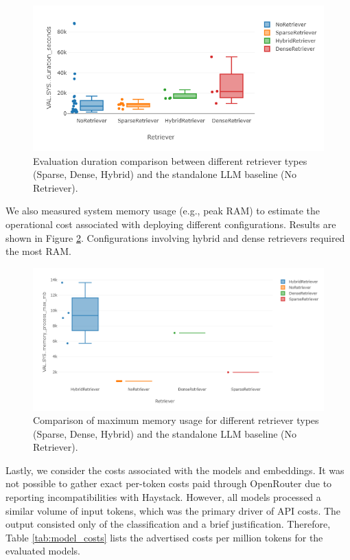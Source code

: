 \begin{figure}[!ht]
    \centering
    \includegraphics[width=\textwidth]{images/duration-retriever.png}
    \caption{Evaluation duration comparison between different retriever types (Sparse, Dense, Hybrid) and the standalone LLM baseline (No Retriever).}
    \label{fig:evaluation-time}
\end{figure}

We also measured system memory usage (e.g., peak RAM) to estimate the operational cost associated with deploying different configurations. Results are shown in Figure \ref{fig:memory}. Configurations involving hybrid and dense retrievers required the most RAM.

\begin{figure}[!ht]
    \centering
    \includegraphics[width=\textwidth]{images/Max MB RAM.png}
    \caption{Comparison of maximum memory usage for different retriever types (Sparse, Dense, Hybrid) and the standalone LLM baseline (No Retriever).}
    \label{fig:memory}
\end{figure}

Lastly, we consider the costs associated with the models and embeddings. It was not possible to gather exact per-token costs paid through OpenRouter due to reporting incompatibilities with Haystack. However, all models processed a similar volume of input tokens, which was the primary driver of API costs. The output consisted only of the classification and a brief justification. Therefore, Table \ref{tab:model_costs} lists the advertised costs per million tokens for the evaluated models.

